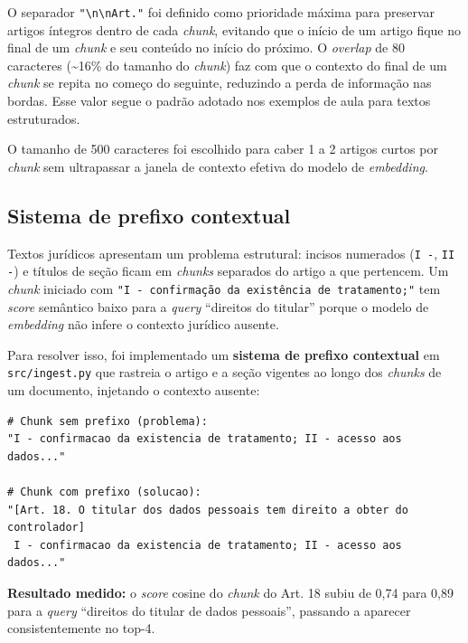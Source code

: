 \documentclass[
  12pt,
  a4paper,
  brazil,
  article,
  oneside,
  sumario=tradicional
]{abntex2}
\begin{document}
O separador \texttt{"\textbackslash{}n\textbackslash{}nArt."} foi definido como
prioridade máxima para preservar artigos íntegros dentro de cada \textit{chunk},
evitando que o início de um artigo fique no final de um \textit{chunk} e seu conteúdo
no início do próximo. O \textit{overlap} de 80 caracteres (\textasciitilde{}16\% do
tamanho do \textit{chunk}) faz com que o contexto do final de um \textit{chunk}
se repita no começo do seguinte, reduzindo a perda de informação nas bordas. Esse
valor segue o padrão adotado nos exemplos de aula para textos estruturados.

O tamanho de 500 caracteres foi escolhido para caber 1 a 2 artigos curtos por
\textit{chunk} sem ultrapassar a janela de contexto efetiva do modelo de
\textit{embedding}.

\subsection{Sistema de prefixo contextual}

Textos jurídicos apresentam um problema estrutural: incisos numerados (\texttt{I -},
\texttt{II -}) e títulos de seção ficam em \textit{chunks} separados do artigo a que
pertencem. Um \textit{chunk} iniciado com \texttt{"I - confirmação da existência de
tratamento;"} tem \textit{score} semântico baixo para a \textit{query} ``direitos do
titular'' porque o modelo de \textit{embedding} não infere o contexto jurídico ausente.

Para resolver isso, foi implementado um \textbf{sistema de prefixo contextual} em
\texttt{src/ingest.py} que rastreia o artigo e a seção vigentes ao longo dos
\textit{chunks} de um documento, injetando o contexto ausente:

\begin{lstlisting}[style=python,
  caption={Prefixo contextual para inciso solto (Art.\ 18)},
  label=lst:prefix]
# Chunk sem prefixo (problema):
"I - confirmacao da existencia de tratamento; II - acesso aos dados..."

# Chunk com prefixo (solucao):
"[Art. 18. O titular dos dados pessoais tem direito a obter do controlador]
 I - confirmacao da existencia de tratamento; II - acesso aos dados..."
\end{lstlisting}

\textbf{Resultado medido:} o \textit{score} cosine do \textit{chunk} do Art. 18 subiu
de 0,74 para 0,89 para a \textit{query} ``direitos do titular de dados pessoais'',
passando a aparecer consistentemente no top-4.
\end{document}
